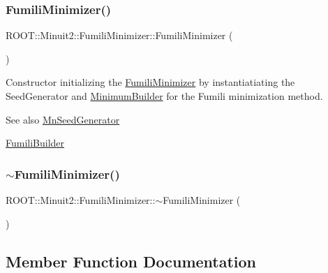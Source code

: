 \subsubsection{\texorpdfstring{FumiliMinimizer()}{FumiliMinimizer()}\hspace{0.1cm}{\footnotesize\ttfamily [3/3]}}
{\footnotesize\ttfamily R\+O\+O\+T\+::\+Minuit2\+::\+Fumili\+Minimizer\+::\+Fumili\+Minimizer (\begin{DoxyParamCaption}{ }\end{DoxyParamCaption})\hspace{0.3cm}{\ttfamily [inline]}}

Constructor initializing the \mbox{\hyperlink{classROOT_1_1Minuit2_1_1FumiliMinimizer}{Fumili\+Minimizer}} by instantiatiating the Seed\+Generator and \mbox{\hyperlink{classROOT_1_1Minuit2_1_1MinimumBuilder}{Minimum\+Builder}} for the Fumili minimization method.

\begin{DoxySeeAlso}{See also}
\mbox{\hyperlink{classROOT_1_1Minuit2_1_1MnSeedGenerator}{Mn\+Seed\+Generator}}

\mbox{\hyperlink{classROOT_1_1Minuit2_1_1FumiliBuilder}{Fumili\+Builder}} 
\end{DoxySeeAlso}
\mbox{\label{classROOT_1_1Minuit2_1_1FumiliMinimizer_a2e482171de26d153b98228aa41adee3e}} 
\subsubsection{\texorpdfstring{$\sim$FumiliMinimizer()}{~FumiliMinimizer()}\hspace{0.1cm}{\footnotesize\ttfamily [3/3]}}
{\footnotesize\ttfamily R\+O\+O\+T\+::\+Minuit2\+::\+Fumili\+Minimizer\+::$\sim$\+Fumili\+Minimizer (\begin{DoxyParamCaption}{ }\end{DoxyParamCaption})\hspace{0.3cm}{\ttfamily [inline]}}



\subsection{Member Function Documentation}
\mbox{\label{classROOT_1_1Minuit2_1_1FumiliMinimizer_a24d20e7cd4a335f60616fd7cafe0739c}} 
